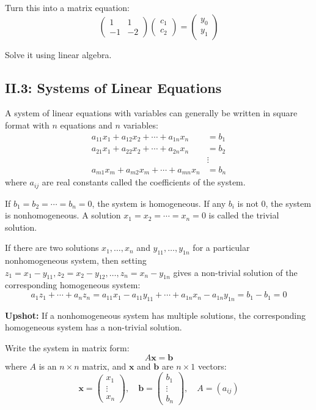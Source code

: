 \documentclass{article}
\begin{document}
Turn this into a matrix equation:
\[
\begin{pmatrix}
1 & 1 \\
-1 & -2
\end{pmatrix}
\begin{pmatrix}
c_1 \\
c_2
\end{pmatrix}
=
\begin{pmatrix}
y_0 \\
y_1
\end{pmatrix}
\]

Solve it using linear algebra.

\subsection*{II.3: Systems of Linear Equations}

A system of linear equations with variables can generally be written in square format with \( n \) equations and \( n \) variables:
\[
\begin{aligned}
a_{11}x_1 + a_{12}x_2 + \cdots + a_{1n}x_n &= b_1 \\
a_{21}x_1 + a_{22}x_2 + \cdots + a_{2n}x_n &= b_2 \\
&\vdots \\
a_{m1}x_m + a_{m2}x_m + \cdots + a_{mn}x_n &= b_n
\end{aligned}
\]
where \( a_{ij} \) are real constants called the coefficients of the system.

If \( b_1 = b_2 = \cdots = b_n = 0 \), the system is homogeneous. If any \( b_i \) is not 0, the system is nonhomogeneous. A solution \( x_1 = x_2 = \cdots = x_n = 0 \) is called the trivial solution.

If there are two solutions \( x_1, \ldots, x_n \) and \( y_{11}, \ldots, y_{1n} \) for a particular nonhomogeneous system, then setting \( z_1 = x_1 - y_{11}, z_2 = x_2 - y_{12}, \ldots, z_n = x_n - y_{1n} \) gives a non-trivial solution of the corresponding homogeneous system:
\[
a_1z_1 + \cdots + a_nz_n = a_{11}x_1 - a_{11}y_{11} + \cdots + a_{1n}x_n - a_{1n}y_{1n} = b_1 - b_1 = 0
\]

\textbf{Upshot:} If a nonhomogeneous system has multiple solutions, the corresponding homogeneous system has a non-trivial solution.

Write the system in matrix form:
\[
A \mathbf{x} = \mathbf{b}
\]
where \( A \) is an \( n \times n \) matrix, and \( \mathbf{x} \) and \( \mathbf{b} \) are \( n \times 1 \) vectors:
\[
\mathbf{x} = \begin{pmatrix}
x_1 \\
\vdots \\
x_n
\end{pmatrix}, \quad
\mathbf{b} = \begin{pmatrix}
b_1 \\
\vdots \\
b_n
\end{pmatrix}, \quad
A = (a_{ij})
\]
\end{document}
